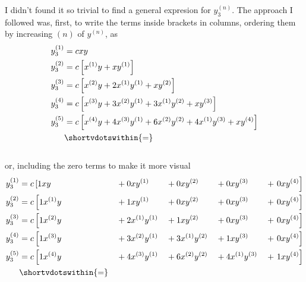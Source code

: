 \documentclass[12pt, a4paper]{article}
\begin{document}
I didn't found it so trivial to find a general expresion for $y_3^{(n)}$. The approach I followed was, first, to write the terms inside brackets in columns, ordering them by increasing $(n)$ of $y^{(n)}$, as
\begin{alignat*}{3}
    y_3^{(1)} &= c x y \\
    y_3^{(2)} &= c \left[ x^{(1)} y + x y^{(1)}  \right] \\
    y_3^{(3)} &= c \left[ x^{(2)} y + 2 x^{(1)} y^{(1)} + x y^{(2)}  \right] \\
    y_3^{(4)} &= c \left[ x^{(3)} y + 3 x^{(2)} y^{(1)} + 3 x^{(1)} y^{(2)} + x y^{(3)} \right] \\
    y_3^{(5)} &= c \left[ x^{(4)} y + 4 x^{(3)} y^{(1)} + 6 x^{(2)} y^{(2)} + 4 x^{(1)} y^{(3)} + x y^{(4)} \right] \\
              &\shortvdotswithin{=} \notag
\end{alignat*} \\[-10mm]
or, including the zero terms to make it more visual
\begin{alignat*}{5}
    y_3^{(1)} &= c \left[ 1 x y       \right. &&+ 0 x y^{(1)}       &&+ 0 x y^{(2)}       &&+ 0 x y^{(3)}       &&+ \left. 0 x y^{(4)} \right] \\
    y_3^{(2)} &= c \left[ 1 x^{(1)} y \right. &&+ 1 x y^{(1)}       &&+ 0 x y^{(2)}       &&+ 0 x y^{(3)}       &&+ \left. 0 x y^{(4)} \right] \\
    y_3^{(3)} &= c \left[ 1 x^{(2)} y \right. &&+ 2 x^{(1)} y^{(1)} &&+ 1 x y^{(2)}       &&+ 0 x y^{(3)}       &&+ \left. 0 x y^{(4)} \right] \\
    y_3^{(4)} &= c \left[ 1 x^{(3)} y \right. &&+ 3 x^{(2)} y^{(1)} &&+ 3 x^{(1)} y^{(2)} &&+ 1 x y^{(3)}       &&+ \left. 0 x y^{(4)} \right] \\
    y_3^{(5)} &= c \left[ 1 x^{(4)} y \right. &&+ 4 x^{(3)} y^{(1)} &&+ 6 x^{(2)} y^{(2)} &&+ 4 x^{(1)} y^{(3)} &&+ \left. 1 x y^{(4)} \right] \\
              &\shortvdotswithin{=} \notag
\end{alignat*} \\[-15mm]
\end{document}

